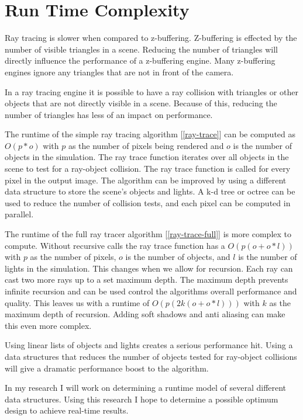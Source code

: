 \section{Run Time Complexity}
Ray tracing is slower when compared to z-buffering.  Z-buffering is effected by the number of visible triangles in a scene.  Reducing the number of triangles will directly influence the performance of a z-buffering engine.  Many z-buffering engines ignore any triangles that are not in front of the camera.

In a ray tracing engine it is possible to have a ray collision with triangles or other objects that are not directly visible in a scene.  Because of this, reducing the number of triangles has less of an impact on performance.

The runtime of the simple ray tracing algorithm [\ref{ray-trace}] can be computed as $O(p*o)$ with $p$ as the number of pixels being rendered and $o$ is the number of objects in the simulation.    The ray trace function iterates over all objects in the scene to test for a ray-object collision.  The ray trace function is called for every pixel in the output image.   The algorithm can be improved by using a different data structure to store the scene's objects and lights.  A k-d tree or octree can be used to reduce the number of collision tests, and each pixel can be computed in parallel.

The runtime of the full ray tracer algorithm [\ref{ray-trace-full}] is more complex to compute.  Without recursive calls the ray trace function has a $O( p(o + o*l ))$ with $p$ as the number of pixels, $o$ is the number of objects, and $l$ is the number of lights in the simulation.  This changes when we allow for recursion.  Each ray can cast two more rays up to a set maximum depth.  The maximum depth prevents infinite recursion and can be used control the algorithms overall performance and quality.  This leaves us with a runtime of $O( p( 2k( o +o*l )))$ with $k$ as the maximum depth of recursion.   Adding soft shadows and anti aliasing can make this even more complex.

Using linear lists of objects and lights creates a serious performance hit.  Using a data structures that reduces the number of objects tested for ray-object collisions will give a dramatic performance boost to the algorithm.

In my research I will work on determining a runtime model of several different data structures.  Using this research I hope to determine a possible optimum design to achieve real-time results. 
